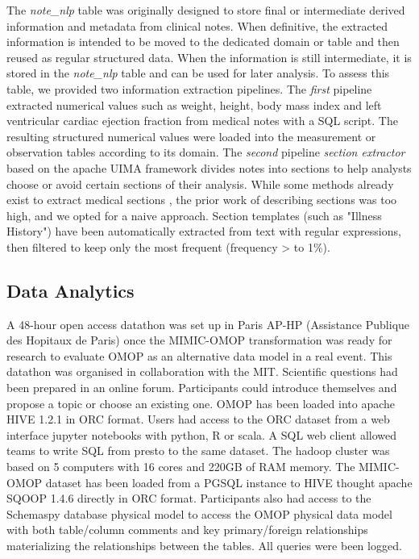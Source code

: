 The \textit{note\_nlp} table was originally designed to store final or intermediate 
derived information and metadata from clinical notes. When definitive, the 
extracted information is intended to be moved to the dedicated domain or table 
and then reused as regular structured data. 
When the information is still intermediate, it is stored in the \textit{note\_nlp} 
table and can be used for later analysis. 
To assess this table, we provided two information extraction pipelines. 
The \emph{first} pipeline extracted numerical values such as weight, height, 
body mass index and left ventricular cardiac ejection fraction from medical notes 
with a SQL script. The resulting structured numerical values were loaded into the 
measurement or observation tables according to its domain. 
The \emph{second} pipeline \emph{section extractor} based on the apache UIMA 
framework divides notes into sections to help analysts choose or avoid certain 
sections of their analysis. While some methods already exist to extract 
medical sections \cite{section-extraction}, the prior work of describing sections 
was too high, and we opted for a naive approach. Section templates (such as 
"Illness History") have been automatically extracted from text with regular 
expressions, then filtered to keep only the most frequent (frequency > to 1\%). 

%
%
\subsection{Data Analytics}

A 48-hour open access datathon \cite{mimic-omop-datathon} was set up in Paris AP-HP 
(Assistance Publique des Hopitaux de Paris) once the MIMIC-OMOP transformation was 
ready for research to evaluate OMOP as an alternative data model in a real event. 
This datathon was organised in collaboration with the MIT.
Scientific questions had been prepared in an online forum. Participants could 
introduce themselves and propose a topic or choose an existing one. 
OMOP has been loaded into apache HIVE 1.2.1 in ORC format. Users had access to 
the ORC dataset from a web interface jupyter notebooks with python, R or scala. 
A SQL web client allowed teams to write SQL from presto to the same dataset. 
The hadoop cluster was based on 5 computers with 16 cores and 220GB of RAM memory. 
The MIMIC-OMOP dataset has been loaded from a PGSQL instance to HIVE thought apache 
SQOOP 1.4.6 directly in ORC format. Participants also had access to the Schemaspy 
database physical model to access the OMOP physical data model with both 
table/column comments and key primary/foreign relationships materializing the 
relationships between the tables. All queries were been logged.

